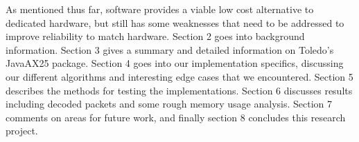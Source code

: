 As mentioned thus far, software provides a viable low cost alternative to dedicated hardware, but still has some weaknesses that need to be addressed to improve reliability to match hardware. Section 2 goes into background information. Section 3 gives a summary and detailed information on Toledo's JavaAX25 package. Section 4 goes into our implementation specifics, discussing our different algorithms and interesting edge cases that we encountered. Section 5 describes the methods for testing the implementations. Section 6 discusses results including decoded packets and some rough memory usage analysis. Section 7 comments on areas for future work, and finally section 8 concludes this research project.

